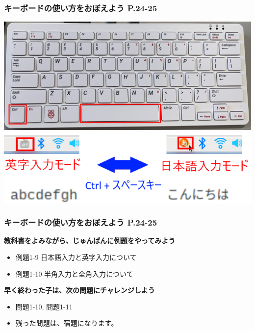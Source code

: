 \documentclass[dvipdfmx]{beamer}
\begin{document}
\begin{frame}[fragile]
	\frametitle{キーボードの使い方をおぼえよう P.24-25~~~}
    \includegraphics[width=\textwidth]{slide02_002.png}
    \vfill
    \includegraphics[width=\textwidth]{slide02_003.png}\\
\end{frame}

\begin{frame}[fragile]
	\frametitle{キーボードの使い方をおぼえよう P.24-25~~~}
    \large\textbf{教科書をよみながら、じゅんばんに例題をやってみよう}
    				\begin{itemize}
    					\item 例題1-9 日本語入力と英字入力について
    					\item 例題1-10 半角入力と全角入力について
    				\end{itemize}
          \vfill
          \large\textbf{早く終わった子は、次の問題にチャレンジしよう}
          \begin{itemize}
            \item 問題1-10, 問題1-11
            \item 残った問題は、宿題になります。
          \end{itemize}
\end{frame}
\end{document}
